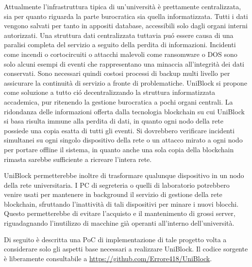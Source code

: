Attualmente l'infrastruttura tipica di un'università è prettamente centralizzata, sia per quanto riguarda la parte burocratica sia quella informatizzata. Tutti i dati vengono salvati per tanto in appositi database, accessibili solo dagli organi interni autorizzati. Una struttura dati centralizzata tuttavia pu\'o essere causa di una paralisi completa del servizio a seguito della perdita di informazioni. Incidenti come incendi o cortocircuiti o attacchi malevoli come ransomware o DOS sono solo alcuni esempi di eventi che rappresentano una minaccia all'integrità dei dati conservati. Sono necessari quindi costosi processi di backup multi livello per assicurare la continuità di servizio a fronte di problematiche. UniBlock si propone come soluzione a tutto ci\'o decentralizzando la struttura informatizzata accademica, pur ritenendo la gestione burocratica a pochi organi centrali. La ridondanza delle informazioni offerta dalla tecnologia blockchain su cui UniBlock si basa risulta immune alla perdita di dati, in quanto ogni nodo della rete possiede una copia esatta di tutti gli eventi. Si dovrebbero verificare incidenti simultanei su ogni singolo dispositivo della rete o un attacco mirato a ogni nodo per portare offline il sistema, in quanto anche una sola copia della blockchain rimasta sarebbe sufficiente a ricreare l'intera rete.

UniBlock permetterebbe inoltre di trasformare qualunque dispositivo in un nodo della rete universitaria. I PC di segreteria o quelli di laboratorio potrebbero venire usati per mantenere in background il servizio di gestione della rete blockchain, sfruttando l'inattività di tali dispositivi per minare i nuovi blocchi. Questo permetterebbe di evitare l'acquisto e il mantenimento di grossi server, riguadagnando l'inutilizzo di macchine già operanti all'interno dell'università.

Di seguito è descritta una PoC di implementazione di tale progetto volta a considerare solo gli aspetti base necessari a realizzare UniBlock. Il codice sorgente è liberamente consultabile a \url{https://github.com/Errore418/UniBlock}.
